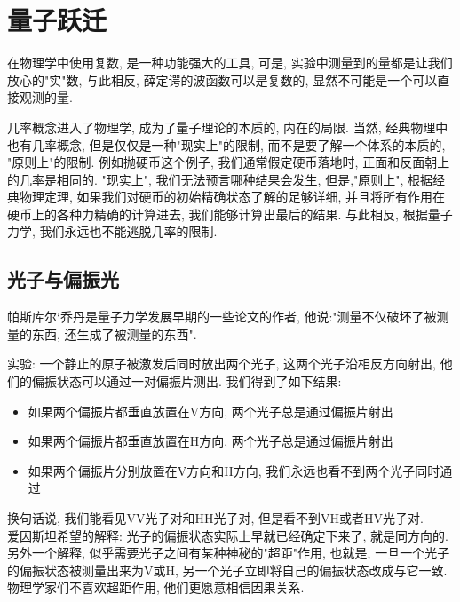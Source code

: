 \documentclass{article}
\begin{document}
\section{量子跃迁}
在物理学中使用复数, 是一种功能强大的工具, 可是, 实验中测量到的量都是让我们放心的"实"数, 与此相反, 薛定谔的波函数可以是复数的, 显然不可能是一个可以直接观测的量.

几率概念进入了物理学, 成为了量子理论的本质的, 内在的局限. 当然, 经典物理中也有几率概念, 但是仅仅是一种"现实上"的限制, 而不是要了解一个体系的本质的, "原则上"的限制.
例如抛硬币这个例子, 我们通常假定硬币落地时, 正面和反面朝上的几率是相同的. "现实上", 我们无法预言哪种结果会发生,
但是,"原则上", 根据经典物理定理, 如果我们对硬币的初始精确状态了解的足够详细, 并且将所有作用在硬币上的各种力精确的计算进去, 我们能够计算出最后的结果.
与此相反, 根据量子力学, 我们永远也不能逃脱几率的限制.

\subsection{光子与偏振光}
帕斯库尔`乔丹是量子力学发展早期的一些论文的作者, 他说:"测量不仅破坏了被测量的东西, 还生成了被测量的东西".

实验: 一个静止的原子被激发后同时放出两个光子, 这两个光子沿相反方向射出, 他们的偏振状态可以通过一对偏振片测出. 我们得到了如下结果:
\begin{itemize}
	\item 如果两个偏振片都垂直放置在V方向, 两个光子总是通过偏振片射出
	\item 如果两个偏振片都垂直放置在H方向, 两个光子总是通过偏振片射出
	\item 如果两个偏振片分别放置在V方向和H方向, 我们永远也看不到两个光子同时通过
\end{itemize}
换句话说, 我们能看见VV光子对和HH光子对, 但是看不到VH或者HV光子对.\\
爱因斯坦希望的解释: 光子的偏振状态实际上早就已经确定下来了, 就是同方向的.\\
另外一个解释, 似乎需要光子之间有某种神秘的"超距"作用, 也就是, 一旦一个光子的偏振状态被测量出来为V或H, 另一个光子立即将自己的偏振状态改成与它一致.\\
物理学家们不喜欢超距作用, 他们更愿意相信因果关系.
\end{document}
